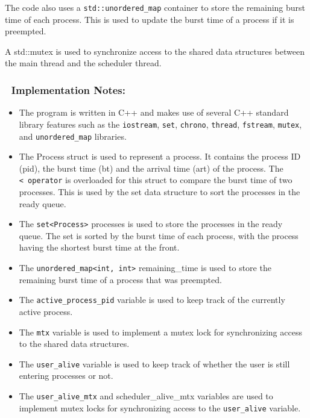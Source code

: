 The code also uses a \texttt{std::unordered\_map} container to store the
remaining burst time of each process. This is used to update the burst
time of a process if it is preempted.

A std::mutex is used to synchronize access to the shared data structures
between the main thread and the scheduler thread.

\hypertarget{implementation-notes}{%
\subsubsection{🏰 Implementation Notes:}\label{implementation-notes}}

\begin{itemize}
\item
  The program is written in C++ and makes use of several C++ standard
  library features such as the \texttt{iostream}, \texttt{set},
  \texttt{chrono}, \texttt{thread}, \texttt{fstream}, \texttt{mutex},
  and \texttt{unordered\_map} libraries.
\item
  The Process struct is used to represent a process. It contains the
  process ID (pid), the burst time (bt) and the arrival time (art) of
  the process. The \texttt{\textless{}\ operator} is overloaded for this
  struct to compare the burst time of two processes. This is used by the
  set data structure to sort the processes in the ready queue.
\item
  The \texttt{set\textless{}Process\textgreater{}} processes is used to
  store the processes in the ready queue. The set is sorted by the burst
  time of each process, with the process having the shortest burst time
  at the front.
\item
  The \texttt{unordered\_map\textless{}int,\ int\textgreater{}}
  remaining\_time is used to store the remaining burst time of a process
  that was preempted.
\item
  The \texttt{active\_process\_pid} variable is used to keep track of
  the currently active process.
\item
  The \texttt{mtx} variable is used to implement a mutex lock for
  synchronizing access to the shared data structures.
\item
  The \texttt{user\_alive} variable is used to keep track of whether the
  user is still entering processes or not.
\item
  The \texttt{user\_alive\_mtx} and scheduler\_alive\_mtx variables are
  used to implement mutex locks for synchronizing access to the
  \texttt{user\_alive} variable.

\end{itemize}

